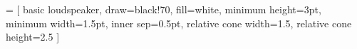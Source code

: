 
 = [
  basic loudspeaker, 
  draw=black!70, 
  fill=white, 
  minimum height=3pt,
  minimum width=1.5pt,
  inner sep=0.5pt,
  relative cone width=1.5,
  relative cone height=2.5
]


